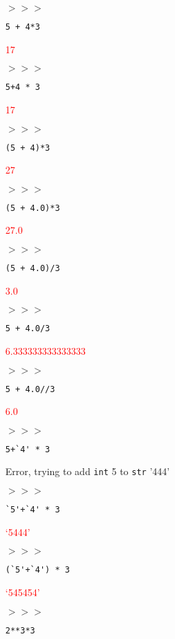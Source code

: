 \documentclass[11pt]{article}
\newcommand{\ans}[1]{\textcolor{red}{#1}}
\begin{document}
\begin{itemize}
\item[$>>>$] \begin{verbatim}5 + 4*3\end{verbatim}
\item[] \ans{17}
\item[$>>>$] \begin{verbatim}5+4 * 3\end{verbatim}
\item[] \ans{17}
\item[$>>>$] \begin{verbatim}(5 + 4)*3\end{verbatim}
\item[] \ans{27}
\item[$>>>$] \begin{verbatim}(5 + 4.0)*3\end{verbatim}
\item[] \ans{27.0}
\item[$>>>$] \begin{verbatim}(5 + 4.0)/3\end{verbatim}
\item[] \ans{3.0}
\item[$>>>$] \begin{verbatim}5 + 4.0/3\end{verbatim}
\item[] \ans{6.333333333333333}
\item[$>>>$] \begin{verbatim}5 + 4.0//3\end{verbatim}
\item[] \ans{6.0}
\item[$>>>$] \begin{verbatim}5+`4' * 3\end{verbatim}
\item[] Error, trying to add \texttt{int} 5 to \texttt{str} '444'
\item[$>>>$] \begin{verbatim}`5'+`4' * 3\end{verbatim}
\item[] \ans{`5444'}
\item[$>>>$] \begin{verbatim}(`5'+`4') * 3\end{verbatim}
\item[] \ans{`545454'}
\item[$>>>$] \begin{verbatim}2**3*3\end{verbatim}

\end{itemize}
\end{document}

